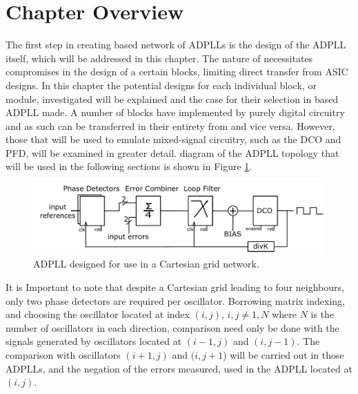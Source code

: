 \section{Chapter Overview}
The first step in creating  based network of \acfp{ADPLL} is the design of the \ac{ADPLL} itself, which will be addressed in this chapter. The nature of  necessitates compromises in the design of a certain blocks, limiting direct transfer from \ac{ASIC} designs. In this chapter the potential designs for each individual block, or module, investigated will be explained and the case for their selection in  based \ac{ADPLL} made. A number of blocks have implemented by purely digital circuitry and as such can be transferred in their entirety from  and vice versa. However, those that will be used to emulate mixed-signal circuitry, such as the \ac{DCO} and \ac{PFD}, will be examined in greater detail.  diagram of the \ac{ADPLL} topology that will be used in the following sections is shown in Figure \ref{fig:network_adpll}.
\begin{figure}[h]
	\centering
	\includegraphics[width=\textwidth]{../network_adpll}
	\caption{\acs{ADPLL} designed for use in a Cartesian grid network.}
	\label{fig:network_adpll}
\end{figure}

It is Important to note that despite a Cartesian grid leading to four neighbours, only two phase detectors are required per oscillator. Borrowing matrix indexing, and choosing the oscillator located at index $(i,j)$, $i,j \neq 1,N$ where $N$ is the number of oscillators in each direction, comparison need only be done with the signals generated by oscillators located at $(i-1,j)$ and $(i,j-1)$. The comparison with oscillators $(i+1,j)$ and $(i,j+1$) will be carried out in those \acp{ADPLL}, and the negation of the errors measured, used in the \ac{ADPLL} located at $(i,j)$.

